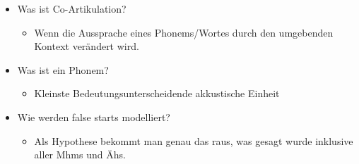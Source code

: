 \documentclass[11pt]{article}
\begin{document}
\begin{itemize}
\begin{itemize}
\end{itemize}
\item Was ist Co-Artikulation?
\begin{itemize}
\item Wenn die Aussprache eines Phonems/Wortes durch den umgebenden Kontext verändert wird.
\end{itemize}
\item Was ist ein Phonem? 
\begin{itemize}
\item Kleinste Bedeutungsunterscheidende akkustische Einheit
\end{itemize}
\item Wie werden false starts modelliert? 
\begin{itemize}
\item Als Hypothese bekommt man genau das raus, was gesagt wurde inklusive aller Mhms und Ähs.
\end{itemize}
\end{itemize}
\end{document}
